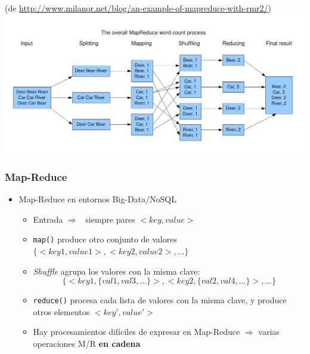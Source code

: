 \documentclass[14pt]{beamer}
\newcommand{\ra}{{\color{blue} $\Rightarrow${}~{}}}
\begin{document}
\begin{frame}
\framebreak

(de \url{http://www.milanor.net/blog/an-example-of-mapreduce-with-rmr2/})
\centering\includegraphics[width=\textwidth]{img/MapReduceWordcount}
\end{frame}

\begin{frame}
\frametitle{Map-Reduce}
\begin{itemize}
\item Map-Reduce en entornos Big-Data/NoSQL
  \begin{itemize}
  \item Entrada \ra{} siempre pares $<key,value>$

  \item {\tt map()} produce otro conjunto de valores
    $\{<key1,value1>,<key2,value2>,...\}$

\item {\em Shuffle} agrupa los valores con la misma clave:
\begin{displaymath}
\{<key1,\{val1,val3,...\}>,<key2,\{val2,val4,...\}>,...\}
\end{displaymath}

\item {\tt reduce()} procesa cada lista de valores con la misma clave, y
  produce otros elementos $<key',value'>$

\item Hay procesamientos difíciles de expresar en Map-Reduce $\Rightarrow$
  varias operaciones M/R {\bf en cadena}
  \end{itemize}
\end{itemize}
\end{frame}
\end{document}
